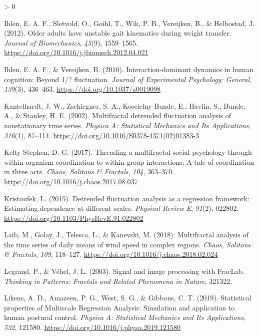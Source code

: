 \documentclass[
  english,
  man]{apa6}
\newlength{\cslhangindent}
\newenvironment{CSLReferences}[2] %
 {%
  \setlength{\parindent}{0pt}
  \ifodd #1 \everypar{\setlength{\hangindent}{\cslhangindent}}\ignorespaces\fi
  \ifnum #2 > 0
  \setlength{\parskip}{#2\baselineskip}
  \fi
 }%
 {}
\begin{document}
\begin{CSLReferences}{1}{0}
\leavevmode\hypertarget{ref-ihlen2012}{}%
Ihlen, E. A. F., Sletvold, O., Goihl, T., Wik, P. B., Vereijken, B., \& Helbostad, J. (2012). Older adults have unstable gait kinematics during weight transfer. \emph{Journal of Biomechanics}, \emph{45}(9), 1559--1565. \url{https://doi.org/10.1016/j.jbiomech.2012.04.021}

\leavevmode\hypertarget{ref-ihlen2010}{}%
Ihlen, E. A. F., \& Vereijken, B. (2010). Interaction-dominant dynamics in human cognition: Beyond 1/{{}}? fluctuation. \emph{Journal of Experimental Psychology: General}, \emph{139}(3), 436--463. \url{https://doi.org/10.1037/a0019098}

\leavevmode\hypertarget{ref-kantelhardt2002}{}%
Kantelhardt, J. W., Zschiegner, S. A., Koscielny-Bunde, E., Havlin, S., Bunde, A., \& Stanley, H. E. (2002). Multifractal detrended fluctuation analysis of nonstationary time series. \emph{Physica A: Statistical Mechanics and Its Applications}, \emph{316}(1), 87--114. \url{https://doi.org/10.1016/S0378-4371(02)01383-3}

\leavevmode\hypertarget{ref-kelty-stephen2017}{}%
Kelty-Stephen, D. G. (2017). Threading a multifractal social psychology through within-organism coordination to within-group interactions: A tale of coordination in three acts. \emph{Chaos, Solitons \& Fractals}, \emph{104}, 363--370. \url{https://doi.org/10.1016/j.chaos.2017.08.037}

\leavevmode\hypertarget{ref-kristoufek2015}{}%
Kristoufek, L. (2015). Detrended fluctuation analysis as a regression framework: Estimating dependence at different scales. \emph{Physical Review E}, \emph{91}(2), 022802. \url{https://doi.org/10.1103/PhysRevE.91.022802}

\leavevmode\hypertarget{ref-laib2018}{}%
Laib, M., Golay, J., Telesca, L., \& Kanevski, M. (2018). Multifractal analysis of the time series of daily means of wind speed in complex regions. \emph{Chaos, Solitons \& Fractals}, \emph{109}, 118--127. \url{https://doi.org/10.1016/j.chaos.2018.02.024}

\leavevmode\hypertarget{ref-legrand2003}{}%
Legrand, P., \& Véhel, J. L. (2003). Signal and image processing with FracLab. \emph{Thinking in Patterns: Fractals and Related Phenomena in Nature}, 321322.

\leavevmode\hypertarget{ref-likens2019}{}%
Likens, A. D., Amazeen, P. G., West, S. G., \& Gibbons, C. T. (2019). Statistical properties of Multiscale Regression Analysis: Simulation and application to human postural control. \emph{Physica A: Statistical Mechanics and Its Applications}, \emph{532}, 121580. \url{https://doi.org/10.1016/j.physa.2019.121580}


\end{CSLReferences}
\end{document}
